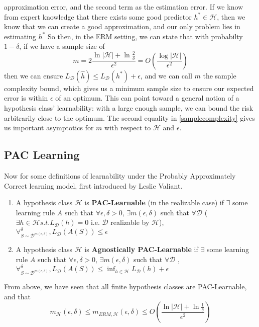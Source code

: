 \documentclass{article}
\newcommand{\D}{\mathcal{D}}
\newcommand{\h}{\mathcal{H}}
\begin{document}
  approximation error, and the second term as the estimation error. If we know
  from expert knowledge that there exists some good predictor $h^* \in \h$,
  then
  we know that we can create a good approximation, and our only problem
  lies in estimating $h^*$ So then, in the ERM setting, we can state that with
  probabilty \geq $ 1 - \delta$, if
  we have a sample size of
  \begin{equation}\label{samplecomplexity}
    m = 2\frac{\ln |\h | + \ln \frac{2}{\delta}}{\epsilon^2}
    = O(\frac{\log |\h|}{\epsilon^2})
  \end{equation}
  then we can ensure $L_\D(\hat{h}) \leq L_\D( h^*) + \epsilon$, and we can
  call $m$ the sample complexity bound, which gives us a minimum sample
  size to ensure our expected error is within $\epsilon$ of an optimum. This
  can point toward a general notion of a hypothesis class' learnability: with a
  large enough sample, we can bound the risk arbitrarily close to the optimum.
  The second equality in \eqref{samplecomplexity} gives us important
  asymptotics for $m$ with respect to $\h$ and $\epsilon$.

  \subsection{PAC Learning}
  Now for some definitions of learnability under the Probably Approximately
  Correct learning model, first introduced by Leslie Valiant.
  \begin{enumerate}
    \item A hypothesis class $\h$ is \textbf{PAC-Learnable}
     (in the realizable case) if $\exists$ some learning rule $A$ such that
     $\forall \epsilon, \delta > 0$, $\exists m(\epsilon, \delta)$ such that
     $\forall \D$ ($\exists h \in \h s.t. L_\D(h) = 0$ i.e. $\D$ realizable
     by $\h$), $\forall_{S \sim \D^{m(\epsilon, \delta)}}^\delta ,
     L_\D(A(S)) \leq \epsilon$
    \item A hypothesis class $\h$ is \textbf{Agnostically PAC-Learnable}
     if $\exists$ some learning rule $A$ such that
     $\forall \epsilon, \delta > 0$, $\exists m(\epsilon, \delta)$ such that
     $\forall \D$ , $\forall_{S \sim \D^{m(\epsilon, \delta)}}^\delta ,
     L_\D(A(S)) \leq \inf_{h \in \h} L_\D(h) +  \epsilon$
  \end{enumerate}
  From above, we have seen that all finite hypothesis classes are
  PAC-Learnable, and that
  $$m_\h (\epsilon, \delta) \leq m_{ERM, \h}(\epsilon, \delta) \leq
  O \left( \frac{\ln |\h | + \ln \frac{1}{\delta}}{\epsilon^2} \right)$$
\end{document}
